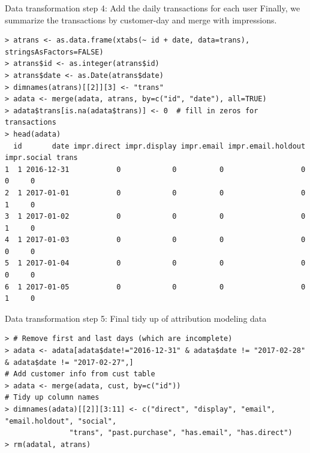 \documentclass[10pt, aspectratio=169]{beamer}
\begin{document}
\begin{frame}[fragile]{Data transformation step 4: Add the daily transactions for each user}
Finally, we summarize the transactions by customer-day and merge with impressions.
\begin{lstlisting}[basicstyle=\tiny\ttfamily]
> atrans <- as.data.frame(xtabs(~ id + date, data=trans), stringsAsFactors=FALSE)
> atrans$id <- as.integer(atrans$id)
> atrans$date <- as.Date(atrans$date)
> dimnames(atrans)[[2]][3] <- "trans"
> adata <- merge(adata, atrans, by=c("id", "date"), all=TRUE)
> adata$trans[is.na(adata$trans)] <- 0  # fill in zeros for transactions
> head(adata)
  id       date impr.direct impr.display impr.email impr.email.holdout impr.social trans
1  1 2016-12-31           0            0          0                  0           0     0
2  1 2017-01-01           0            0          0                  0           1     0
3  1 2017-01-02           0            0          0                  0           1     0
4  1 2017-01-03           0            0          0                  0           0     0
5  1 2017-01-04           0            0          0                  0           0     0
6  1 2017-01-05           0            0          0                  0           1     0
\end{lstlisting}
\end{frame}

\begin{frame}[fragile]{Data transformation step 5: Final tidy up of attribution modeling data}
\footnotesize
\begin{lstlisting}[basicstyle=\tiny\ttfamily]
> # Remove first and last days (which are incomplete)
> adata <- adata[adata$date!="2016-12-31" & adata$date != "2017-02-28" & adata$date != "2017-02-27",] 
# Add customer info from cust table
> adata <- merge(adata, cust, by=c("id"))
# Tidy up column names
> dimnames(adata)[[2]][3:11] <- c("direct", "display", "email", "email.holdout", "social", 
               "trans", "past.purchase", "has.email", "has.direct")
> rm(adatal, atrans)
\end{lstlisting}
\end{frame}
\end{document}
